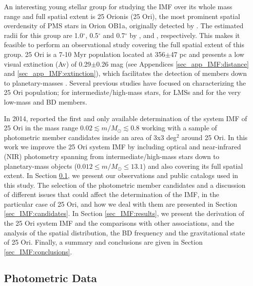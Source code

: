 \documentclass[12pt]{article}
\begin{document}
An interesting young stellar group for studying the IMF over its whole mass range and full spatial extent is 25 Orionis (25 Ori), the most prominent spatial overdensity of PMS stars in Orion OB1a, originally detected by \citet{Briceno2005}. The estimated radii for this group are 1.0$^\circ$, 0.5$^\circ$ and 0.7$^\circ$ by \citet{Briceno2005,Briceno2007}, \citet{Downes2014} and \citet{Briceno2018}, respectively. This makes it feasible to perform an observational study covering the full spatial extent of this group. 25 Ori is a 7-10 Myr population located at 356$\pm$47 pc and presents a low visual extinction (\ac{Av}) of 0.29$\pm$0.26 mag (see Appendices \ref{sec_app_IMF:distance} and \ref{sec_app_IMF:extinction}), which facilitates the detection of members down to planetary-masses \citep{Downes2015}. Several previous studies have focused on characterizing the 25 Ori population; \citet{Kharchenko2005,Kharchenko2013} for intermediate/high-mass stars, \citet{Briceno2005,McGehee2006,Briceno2007,Hernandez2007a,Biazzo2011,Downes2014,Suarez2017,Briceno2018} for LMSs and \citet{Downes2015} for the very low-mass and BD members.

In 2014, \citeauthor{Downes2014} reported the first and only available determination of  the system IMF of 25 Ori in the mass range $0.02\lesssim m/M_\odot\lesssim 0.8$ working with a sample of photometric member candidates inside an area of 3x3 deg$^2$ around 25 Ori. In this work we improve the 25 Ori system IMF by including optical and near-infrared (\ac{NIR}) photometry spanning from intermediate/high-mass stars down to planetary-mass objects ($0.012\le m/M_\odot\le13.1$) and also covering its full spatial extent. In Section \ref{sec_IMF:data}, we present our observations and public catalogs used in this study. The selection of the photometric member candidates and a discussion of different issues that could affect the determination of the IMF, in the particular case of 25 Ori, and how we deal with them are presented in Section \ref{sec_IMF:candidates}. In Section \ref{sec_IMF:results}, we present the derivation of the 25 Ori system IMF and the comparisons with other associations, and the analysis of the spatial distribution, the BD frequency and the gravitational state of 25 Ori. Finally, a summary and conclusions are given in Section \ref{sec_IMF:conclusions}.

\subsection{Photometric Data}
\label{sec_IMF:data}
\end{document}
